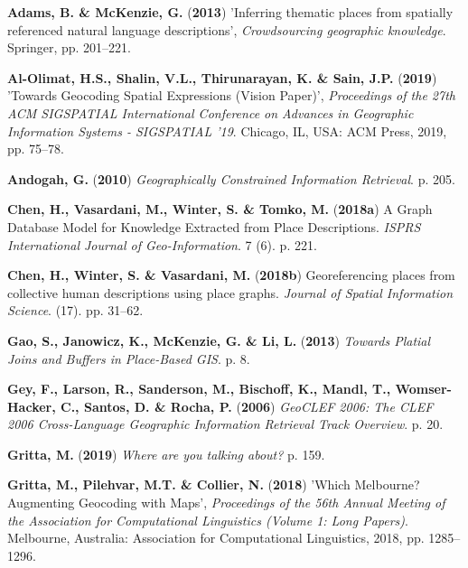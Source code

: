 \documentclass[10pt,]{article}
\newenvironment{cslreferences}%
  {}%
  {\par}
\begin{document}
\hypertarget{refs}{}
\begin{cslreferences}
\leavevmode\hypertarget{ref-adams2013}{}%
\textbf{Adams, B. \& McKenzie, G.} (\textbf{2013}) 'Inferring thematic
places from spatially referenced natural language descriptions',
\emph{Crowdsourcing geographic knowledge}. Springer, pp. 201--221.

\leavevmode\hypertarget{ref-al-olimat2019}{}%
\textbf{Al-Olimat, H.S., Shalin, V.L., Thirunarayan, K. \& Sain, J.P.}
(\textbf{2019}) 'Towards Geocoding Spatial Expressions (Vision Paper)',
\emph{Proceedings of the 27th ACM SIGSPATIAL International Conference on
Advances in Geographic Information Systems - SIGSPATIAL '19}. Chicago,
IL, USA: ACM Press, 2019, pp. 75--78.

\leavevmode\hypertarget{ref-andogah2010}{}%
\textbf{Andogah, G.} (\textbf{2010}) \emph{Geographically Constrained
Information Retrieval}. p. 205.

\leavevmode\hypertarget{ref-chen2018a}{}%
\textbf{Chen, H., Vasardani, M., Winter, S. \& Tomko, M.}
(\textbf{2018a}) A Graph Database Model for Knowledge Extracted from
Place Descriptions. \emph{ISPRS International Journal of
Geo-Information}. 7 (6). p. 221.

\leavevmode\hypertarget{ref-chen2018}{}%
\textbf{Chen, H., Winter, S. \& Vasardani, M.} (\textbf{2018b})
Georeferencing places from collective human descriptions using place
graphs. \emph{Journal of Spatial Information Science}. (17). pp. 31--62.

\leavevmode\hypertarget{ref-gao2013}{}%
\textbf{Gao, S., Janowicz, K., McKenzie, G. \& Li, L.} (\textbf{2013})
\emph{Towards Platial Joins and Buffers in Place-Based GIS}. p. 8.

\leavevmode\hypertarget{ref-gey2006}{}%
\textbf{Gey, F., Larson, R., Sanderson, M., Bischoff, K., Mandl, T.,
Womser-Hacker, C., Santos, D. \& Rocha, P.} (\textbf{2006})
\emph{GeoCLEF 2006: The CLEF 2006 Cross-Language Geographic Information
Retrieval Track Overview}. p. 20.

\leavevmode\hypertarget{ref-gritta2019}{}%
\textbf{Gritta, M.} (\textbf{2019}) \emph{Where are you talking about?}
p. 159.

\leavevmode\hypertarget{ref-gritta2018}{}%
\textbf{Gritta, M., Pilehvar, M.T. \& Collier, N.} (\textbf{2018})
'Which Melbourne? Augmenting Geocoding with Maps', \emph{Proceedings of
the 56th Annual Meeting of the Association for Computational Linguistics
(Volume 1: Long Papers)}. Melbourne, Australia: Association for
Computational Linguistics, 2018, pp. 1285--1296.


\end{cslreferences}
\end{document}
